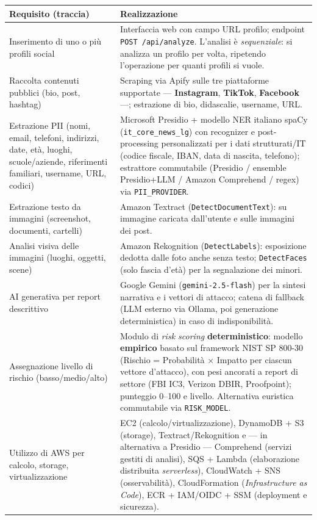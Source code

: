 \documentclass[11pt,a4paper]{article}
\begin{document}
\begin{table}[htbp]
\centering
\footnotesize
\renewcommand{\arraystretch}{1.25}
\begin{tabular}{p{6.2cm} p{8.2cm}}
\toprule
\textbf{Requisito (traccia)} & \textbf{Realizzazione} \\
\midrule
Inserimento di uno o più profili social & Interfaccia web con campo URL profilo; endpoint \texttt{POST /api/analyze}. L'analisi è \emph{sequenziale}: si analizza un profilo per volta, ripetendo l'operazione per quanti profili si vuole. \\
Raccolta contenuti pubblici (bio, post, hashtag) & Scraping via Apify sulle tre piattaforme supportate --- \textbf{Instagram}, \textbf{TikTok}, \textbf{Facebook} ---; estrazione di bio, didascalie, username, URL. \\
Estrazione PII (nomi, email, telefoni, indirizzi, date, età, luoghi, scuole/aziende, riferimenti familiari, username, URL, codici) & Microsoft Presidio + modello NER italiano spaCy (\texttt{it\_core\_news\_lg}) con recognizer e post-processing personalizzati per i dati strutturati/IT (codice fiscale, IBAN, data di nascita, telefono); estrattore commutabile (Presidio / ensemble Presidio+LLM / Amazon Comprehend / regex) via \texttt{PII\_PROVIDER}. \\
Estrazione testo da immagini (screenshot, documenti, cartelli) & Amazon Textract (\texttt{DetectDocumentText}): su immagine caricata dall'utente e sulle immagini dei post. \\
Analisi visiva delle immagini (luoghi, oggetti, scene) & Amazon Rekognition (\texttt{DetectLabels}): esposizione dedotta dalle foto anche senza testo; \texttt{DetectFaces} (solo fascia d'età) per la segnalazione dei minori. \\
AI generativa per report descrittivo & Google Gemini (\texttt{gemini-2.5-flash}) per la sintesi narrativa e i vettori di attacco; catena di fallback (LLM esterno via Ollama, poi generazione deterministica) in caso di indisponibilità. \\
Assegnazione livello di rischio (basso/medio/alto) & Modulo di \emph{risk scoring} \textbf{deterministico}: modello \textbf{empirico} basato sul framework NIST SP 800-30 (Rischio = Probabilità $\times$ Impatto per ciascun vettore d'attacco), con pesi ancorati a report di settore (FBI IC3, Verizon DBIR, Proofpoint); punteggio 0--100 e livello. Alternativa euristica commutabile via \texttt{RISK\_MODEL}. \\
Utilizzo di AWS per calcolo, storage, virtualizzazione & EC2 (calcolo/virtualizzazione), DynamoDB + S3 (storage), Textract/Rekognition e --- in alternativa a Presidio --- Comprehend (servizi gestiti di analisi), SQS + Lambda (elaborazione distribuita \emph{serverless}), CloudWatch + SNS (osservabilità), CloudFormation (\emph{Infrastructure as Code}), ECR + IAM/OIDC + SSM (deployment e sicurezza). \\

\end{tabular}
\end{table}
\end{document}
